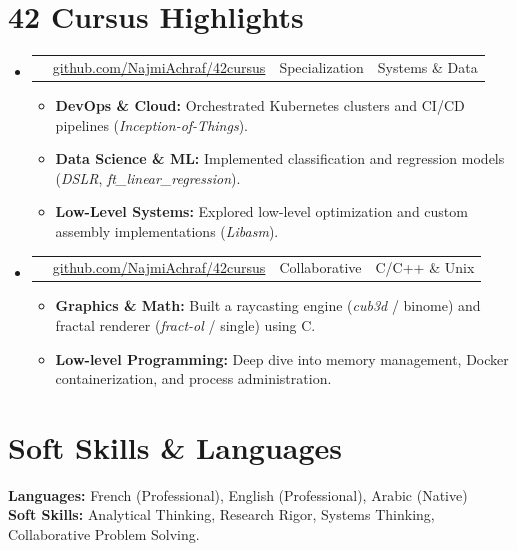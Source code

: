 \documentclass[a4paper,11pt]{article}
\makeatletter
\newcommand{\resumeProject}[4]{
\vspace{0.5mm}\item
    \begin{tabular*}{0.99\textwidth}[t]{
    @{}p{\dimexpr0.23\textwidth-\tabcolsep}@{\hspace{\tabcolsep}} 
    @{}p{\dimexpr0.41\textwidth-\tabcolsep}@{\hspace{\tabcolsep}}
    l@{\extracolsep{\fill}}r}
        \textbf{#1} & \footnotesize{#2} & \footnotesize{#3} & \footnotesize{#4}
    \end{tabular*}
    \vspace{-7mm}
}
\newcommand{\resumeSubHeadingListStart}{\begin{itemize}[leftmargin=*,labelsep=0mm]}
\newcommand{\resumeItemListStart}{\begin{justify}\begin{itemize}[leftmargin=3ex, rightmargin=2ex, noitemsep,labelsep=1.2mm,itemsep=0mm]\small}
\newcommand{\resumeSubHeadingListEnd}{\end{itemize}\vspace{2mm}}
\newcommand{\resumeItemListEnd}{\end{itemize}\end{justify}\vspace{-2mm}}
\newcommand{\iconref}[2]{\textcolor{#1}{\csname fa#2\endcsname}}
\newcommand{\iconweb}[5]{                         
    \href{https://#5}{\vcenteredhbox{\iconref{#1}{#2}} \textcolor{#3}{#4}}
}
\newcommand{\textweb}[2]{                         
    \href{https://#1}{\vcenteredhbox{\textcolor{textcol}{#2}}}
}
\makeatother
\begin{document}
\section{\textbf{42 Cursus Highlights}}
\resumeSubHeadingListStart
    \resumeProject
    {\textweb{github.com/NajmiAchraf/42cursus}{Advanced Curriculum}}
    {\iconweb{pygray}{Github}{pygray}{github.com/NajmiAchraf/42cursus}{github.com/NajmiAchraf/42cursus}}
    {\faIcon{star} Specialization}
    {\faIcon{cloud} Systems \& Data}
    \resumeItemListStart
        \item {\textbf{DevOps \& Cloud:} Orchestrated Kubernetes clusters and CI/CD pipelines (\textit{Inception-of-Things}).}
        \item {\textbf{Data Science \& ML:} Implemented classification and regression models (\textit{DSLR}, \textit{ft\_linear\_regression}).}
        \item {\textbf{Low-Level Systems:} Explored low-level optimization and custom assembly implementations (\textit{Libasm}).}
    \resumeItemListEnd
    \vspace{-2mm}
    \resumeProject
    {\textweb{github.com/NajmiAchraf/42cursus}{Common Core}}
    {\iconweb{pygray}{Github}{pygray}{github.com/NajmiAchraf/42cursus}{github.com/NajmiAchraf/42cursus}}
    {\faIcon{users} Collaborative}
    {\faIcon{code} C/C++ \& Unix}
    \resumeItemListStart
        \item {\textbf{Graphics \& Math:} Built a raycasting engine (\textit{cub3d} / binome) and fractal renderer (\textit{fract-ol} / single) using C.}
        \item {\textbf{Low-level Programming:} Deep dive into memory management, Docker containerization, and process administration.}
    \resumeItemListEnd
    \vspace{-2mm}
\resumeSubHeadingListEnd
\vspace{-5.5mm}

\section{\textbf{Soft Skills \& Languages}}
\vspace{4pt}
 \begin{itemize}[leftmargin=0.05in, label={}]
    \small{\item{
      \textbf{Languages: }{French (Professional), English (Professional), Arabic (Native)} \\
      \textbf{Soft Skills: }{Analytical Thinking, Research Rigor, Systems Thinking, Collaborative Problem Solving.} \\
    }}
 \end{itemize}
\end{document}
